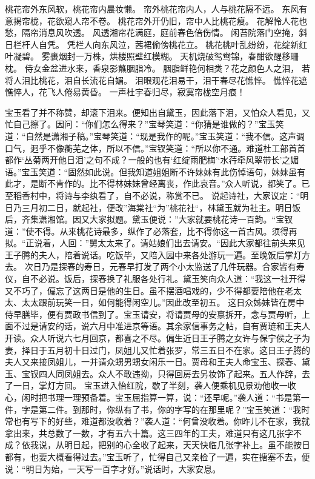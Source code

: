 \documentclass[12pt,oneside]{book}
\begin{document}
桃花帘外东风软，桃花帘内晨妆懒。
帘外桃花帘内人，人与桃花隔不远。
东风有意揭帘栊，花欲窥人帘不卷。
桃花帘外开仍旧，帘中人比桃花瘦。
花解怜人花也愁，隔帘消息风吹透。
风透湘帘花满庭，庭前春色倍伤情。
闲苔院落门空掩，斜日栏杆人自凭。
凭栏人向东风泣，茜裙偷傍桃花立。
桃花桃叶乱纷纷，花绽新红叶凝碧。
雾裹烟封一万株，烘楼照壁红模糊。
天机烧破鸳鸯锦，春酣欲醒移珊枕。
侍女金盆进水来，香泉影蘸胭脂冷。
胭脂鲜艳何相类？花之颜色人之泪，
若将人泪比桃花，泪自长流花自媚。
泪眼观花泪易干，泪干春尽花憔悴。
憔悴花遮憔悴人，花飞人倦易黄昏。
一声杜宇春归尽，寂寞帘栊空月痕！

宝玉看了并不称赞，却滚下泪来。便知出自黛玉，因此落下泪，又怕众人看见，又忙自己擦了。因问：“你们怎么得来？”宝琴笑道：“你猜是谁做的？”宝玉笑道：“自然是潇湘子稿。”宝琴笑道：“现是我作的呢。”宝玉笑道：“我不信。这声调口气，迥乎不像蘅芜之体，所以不信。”宝钗笑道：“所以你不通。难道杜工部首首都作‘丛菊两开他日泪’之句不成？一般的也有‘红绽雨肥梅’‘水荇牵风翠带长’之媚语。”宝玉笑道：“固然如此说。但我知道姐姐断不许妹妹有此伤悼语句，妹妹虽有此才，是断不肯作的。比不得林妹妹曾经离丧，作此哀音。”众人听说，都笑了。已至稻香村中，将诗与李纨看了，自不必说，称赏不已。
说起诗社，大家议定：“明日乃三月初二日，就起社，便改”海棠社“为”桃花社“，林黛玉就为社主。明日饭后，齐集潇湘馆。因又大家拟题。黛玉便说：”大家就要桃花诗一百韵。“宝钗道：”使不得。从来桃花诗最多，纵作了必落套，比不得你这一首古风。须得再拟。“正说着，人回：”舅太太来了。请姑娘们出去请安。“因此大家都往前头来见王子腾的夫人，陪着说话。吃饭毕，又陪入园中来各处游玩一遍。至晚饭后掌灯方去。
次日乃是探春的寿日，元春早打发了两个小太监送了几件玩器。合家皆有寿仪，自不必说。饭后，探春换了礼服各处行礼。黛玉笑向众人道：“我这一社开得又不巧了，偏忘了这两日是他的生日。虽不摆酒唱戏的，少不得都要陪他在老太太、太太跟前玩笑一日，如何能得闲空儿。”因此改至初五。
这日众姊妹皆在房中侍早膳毕，便有贾政书信到了。宝玉请安，将请贾母的安禀拆开，念与贾母听，上面不过是请安的话，说六月中准进京等语。其余家信事务之帖，自有贾琏和王夫人开读。众人听说六七月回京，都喜之不尽。偏生近日王子腾之女许与保宁侯之子为妻，择日于五月初十日过门，凤姐儿又忙着张罗，常三五日不在家。这日王子腾的夫人又来接凤姐儿，一并请众甥男甥女闲乐一日。贾母和王夫人命宝玉、探春、黛玉、宝钗四人同凤姐去。众人不敢违拗，只得回房去另妆饰了起来。五人作辞，去了一日，掌灯方回。
宝玉进入怡红院，歇了半刻，袭人便乘机见景劝他收一收心，闲时把书理一理预备着。宝玉屈指算一算，说：“还早呢。”袭人道：“书是第一件，字是第二件。到那时，你纵有了书，你的字写的在那里呢？”宝玉笑道：“我时常也有写下的好些，难道都没收着？”袭人道：“何曾没收着。你昨儿不在家，我就拿出来，共总数了一数，才有五六十篇。这三四年的工夫，难道只有这几张字不成？依我说，从明日起，把别的心全收了起来，天天快临几张字补上。虽不能按日都有，也要大概看得过去。”宝玉听了，忙得自己又亲检了一遍，实在搪塞不去，便说：“明日为始，一天写一百字才好。”说话时，大家安息。
\end{document}
